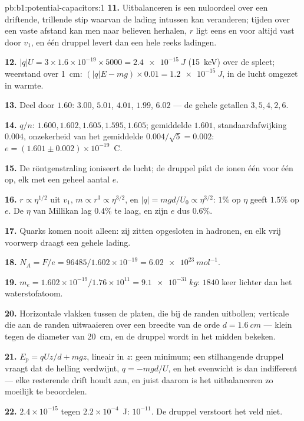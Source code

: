 \begin{solution}{pb:b1:potential-capacitors:1}
\textbf{11.} Uitbalanceren is een nuloordeel over een driftende, trillende stip
waarvan de lading intussen kan veranderen; tijden over een vaste afstand kan men
naar believen herhalen, $r$ ligt eens en voor altijd vast door $v_1$, en één druppel
levert dan een hele reeks ladingen.

\textbf{12.} $|q|U = 3 \times 1.6 \times 10^{-19} \times 5000 = \qty{2.4e-15}{J}$
(\qty{15}{keV}) over de spleet; weerstand over \qty{1}{cm}: $(|q|E - mg) \times 0.01 =
\qty{1.2e-15}{J}$, in de lucht omgezet in warmte.

\textbf{13.} Deel door $1.60$: $3.00$, $5.01$, $4.01$, $1.99$, $6.02$ ---
de gehele getallen $3, 5, 4, 2, 6$.

\textbf{14.} $q/n$: $1.600, 1.602, 1.605, 1.595, 1.605$; gemiddelde $1.601$,
standaardafwijking $0.004$, onzekerheid van het gemiddelde $0.004/\sqrt5 =
0.002$: $e = (1.601 \pm 0.002) \times 10^{-19}$~C.

\textbf{15.} De röntgenstraling ioniseert de lucht; de druppel pikt de ionen één
voor één op, elk met een geheel aantal $e$.

\textbf{16.} $r \propto \eta^{1/2}$ uit $v_1$, $m \propto r^3 \propto \eta^{3/2}$, en
$|q| = mgd/U_0 \propto \eta^{3/2}$: $1\%$ op $\eta$ geeft $1.5\%$ op $e$. De $\eta$ van
Millikan lag $0.4\%$ te laag, en zijn $e$ dus $0.6\%$.

\textbf{17.} Quarks komen nooit alleen: zij zitten opgesloten in hadronen,
en elk vrij voorwerp draagt een gehele lading.

\textbf{18.} $N_A = F/e = 96485/1.602 \times 10^{-19} = \qty{6.02e23}{mol^{-1}}$.

\textbf{19.} $m_e = 1.602 \times 10^{-19}/1.76 \times 10^{11} = \qty{9.1e-31}{kg}$: $1840$
keer lichter dan het waterstofatoom.

\textbf{20.} Horizontale vlakken tussen de platen, die bij de randen
uitbollen; verticale  die aan de randen uitwaaieren over een breedte van de
orde $d = \qty{1.6}{cm}$ --- klein tegen de diameter van \qty{20}{cm}, en
de druppel wordt in het midden bekeken.

\textbf{21.} $E_p = qUz/d + mgz$, lineair in $z$: geen minimum; een stilhangende
druppel vraagt dat de helling verdwijnt, $q = -mgd/U$, en het evenwicht is
dan indifferent --- elke resterende drift houdt aan, en juist daarom is het
uitbalanceren zo moeilijk te beoordelen.

\textbf{22.} $2.4 \times 10^{-15}$ tegen $2.2 \times 10^{-4}$~J: $10^{-11}$. De druppel
verstoort het veld niet.


\end{solution}
